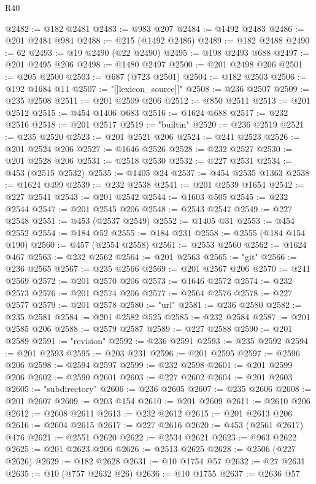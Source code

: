 \begin{lexlean}{R40}
\begin{coremodule}
@2482 := @182 @2481
@2483 := @983 @207
@2484 := @1492 @2483
@2486 := @201 @2484 @984
@2488 := @215 (@1492 @2486)
@2489 := @182 @2488
@2490 := 62
@2493 := @19 @2490 (@22 @2490)
@2495 := @198 @2493 @688
@2497 := @201 @2495 @206
@2498 := @1480 @2497
@2500 := @201 @2498 @206
@2501 := @205 @2500
@2503 := @687 (@723 @2501)
@2504 := @182 @2503
@2506 := @192 @1684 @11
@2507 := "[[lexicon_source]]"
@2508 := @236 @2507
@2509 := @235 @2508
@2511 := @201 @2509 @206
@2512 := @850 @2511
@2513 := @201 @2512
@2515 := @454 @1406 @683
@2516 := @1624 @688
@2517 := @232 @2516
@2518 := @201 @2517
@2519 := "builtin"
@2520 := @236 @2519
@2521 := @235 @2520
@2523 := @201 @2521 @206
@2524 := @241 @2523
@2526 := @201 @2524 @206
@2527 := @1646 @2526
@2528 := @232 @2527
@2530 := @201 @2528 @206
@2531 := @2518 @2530
@2532 := @227 @2531
@2534 := @453 (@2515 @2532)
@2535 := @1405 @24
@2537 := @454 @2535 @1363
@2538 := @1624 @499
@2539 := @232 @2538
@2541 := @201 @2539 @1654
@2542 := @227 @2541
@2543 := @201 @2542
@2544 := @1603 @505
@2545 := @232 @2544
@2547 := @201 @2545 @206
@2548 := @2543 @2547
@2549 := @227 @2548
@2551 := @453 (@2537 @2549)
@2552 := @1405 @31
@2553 := @454 @2552
@2554 := @184 @52
@2555 := @184 @231
@2558 := @2555 (@184 @154 @190)
@2560 := @457 (@2554 @2558)
@2561 := @2553 @2560
@2562 := @1624 @467
@2563 := @232 @2562
@2564 := @201 @2563
@2565 := "git"
@2566 := @236 @2565
@2567 := @235 @2566
@2569 := @201 @2567 @206
@2570 := @241 @2569
@2572 := @201 @2570 @206
@2573 := @1646 @2572
@2574 := @232 @2573
@2576 := @201 @2574 @206
@2577 := @2564 @2576
@2578 := @227 @2577
@2579 := @201 @2578
@2580 := "url"
@2581 := @236 @2580
@2582 := @235 @2581
@2584 := @201 @2582 @525
@2585 := @232 @2584
@2587 := @201 @2585 @206
@2588 := @2579 @2587
@2589 := @227 @2588
@2590 := @201 @2589
@2591 := "revision"
@2592 := @236 @2591
@2593 := @235 @2592
@2594 := @201 @2593
@2595 := @203 @231
@2596 := @201 @2595
@2597 := @2596 @206
@2598 := @2594 @2597
@2599 := @232 @2598
@2601 := @201 @2599 @206
@2602 := @2590 @2601
@2603 := @227 @2602
@2604 := @201 @2603
@2605 := "subdirectory"
@2606 := @236 @2605
@2607 := @235 @2606
@2608 := @201 @2607
@2609 := @203 @154
@2610 := @201 @2609
@2611 := @2610 @206
@2612 := @2608 @2611
@2613 := @232 @2612
@2615 := @201 @2613 @206
@2616 := @2604 @2615
@2617 := @227 @2616
@2620 := @453 (@2561 @2617) @476
@2621 := @2551 @2620
@2622 := @2534 @2621
@2623 := @963 @2622
@2625 := @201 @2623 @206
@2626 := @2513 @2625
@2628 := @2506 (@227 @2626)
@2629 := @182 @2628
@2631 := @10 @1754 @57
@2632 := @27 @2631
@2635 := @10 (@757 @2632 @26)
@2636 := @10 @1755
@2637 := @2636 @57

\end{coremodule}
\end{lexlean}
